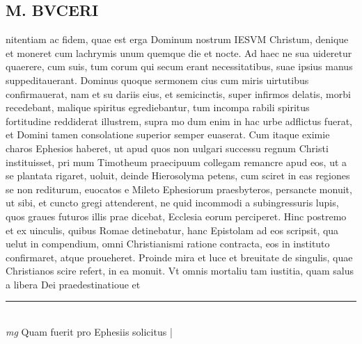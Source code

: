 \documentclass{article}
\begin{document}
\begin{pages}
\section*{M. BVCERI }\pstart nitentiam ac fidem, quae est erga Dominum nostrum IESVM Christum, denique et moneret cum lachrymis unum quemque die et nocte. Ad haec ne sua uideretur quaerere, cum suis, tum corum qui secum erant necessitatibus, suae ipsius manus suppeditauerant. Dominus quoque sermonem cius cum miris uirtutibus confirmauerat, nam et su dariis eius, et semicinctis, super infirmos delatis, morbi recedebant, malique spiritus egrediebantur, tum incompa rabili spiritus fortitudine reddiderat illustrem, supra mo dum enim in hac urbe adflictus fuerat, et Domini tamen consolatione superior semper euaserat.   \pend\pstart Cum itaque eximie charos Ephesios haberet, ut apud quos non uulgari successu regnum Christi instituisset, pri mum Timotheum praecipuum collegam remancre apud eos, ut a se plantata rigaret, uoluit, deinde Hierosolyma petens, cum sciret in eas regiones se non rediturum, euocatos e Mileto Ephesiorum praesbyteros, persancte monuit, ut sibi, et cuncto gregi attenderent, ne quid incommodi a subingressuris lupis, quos graues futuros illis prae dicebat, Ecclesia eorum perciperet. Hinc postremo et ex uinculis, quibus Romae detinebatur, hanc Epistolam ad eos scripsit, qua uelut in compendium, omni Christianismi ratione contracta, eos in instituto confirmaret, atque proueheret.  \pend\pstart Proinde mira et luce et breuitate de singulis, quae Christianos scire refert, in ea monuit.  Vt omnis mortaliu tam iustitia, quam salus a libera Dei praedestinatioue et  \pend
\vspace{0.5cm}\noindent
\vspace{0.2cm}\rule{1cm}{0.2pt}\\ 
\hspace{0.2cm}\textit{mg}
\footnotesize Quam fuerit pro Ephesiis solicitus 
\normalsize| 

\end{pages}
\end{document}
